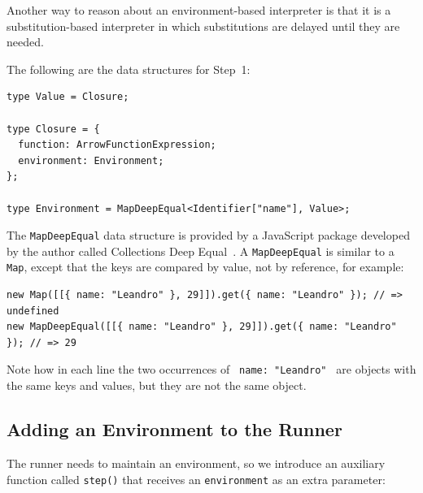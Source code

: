 \documentclass[12pt, oneside]{book}
\begin{document}
\begin{mdframed}[frametitle = {Alternative Argument}]
Another way to reason about an environment-based interpreter is that it is a substitution-based interpreter in which substitutions are delayed until they are needed.
\end{mdframed}

The following are the data structures for Step~1:

\begin{verbatim}
type Value = Closure;

type Closure = {
  function: ArrowFunctionExpression;
  environment: Environment;
};

type Environment = MapDeepEqual<Identifier["name"], Value>;
\end{verbatim}

The \texttt{MapDeepEqual} data structure is provided by a JavaScript package developed by the author called Collections Deep Equal~\cite{collections-deep-equal}. A \texttt{MapDeepEqual} is similar to a \texttt{Map}, except that the keys are compared by value, not by reference, for example:

\begin{verbatim}
new Map([[{ name: "Leandro" }, 29]]).get({ name: "Leandro" }); // => undefined
new MapDeepEqual([[{ name: "Leandro" }, 29]]).get({ name: "Leandro" }); // => 29
\end{verbatim}

Note how in each line the two occurrences of \texttt{{ name: "Leandro" }} are objects with the same keys and values, but they are not the same object.

\subsection{Adding an Environment to the Runner}

The runner needs to maintain an environment, so we introduce an auxiliary function called \texttt{step()} that receives an \texttt{environment} as an extra parameter:
\end{document}
